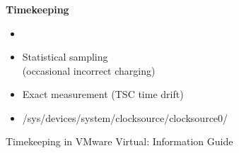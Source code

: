 \documentclass[usenames,dvipsnames, 18pt, compress, aspectratio=169]{beamer}
\begin{document}
\begin{frame}
    \frametitle{}
    \begin{center}
    \textbf{Timekeeping}

        \begin{itemize}
            \item <+->
        \end{itemize}

        \begin{itemize}[label={\MVRightarrow}]
            \item <+-> Statistical sampling \\ (occasional incorrect charging)
            \item <+-> Exact measurement (TSC time drift)
            \item <+-> /sys/devices/system/clocksource/clocksource0/
        \end{itemize}

        \normalsize{Timekeeping in VMware Virtual: Information Guide}
    \end{center}
\end{frame}
\end{document}
